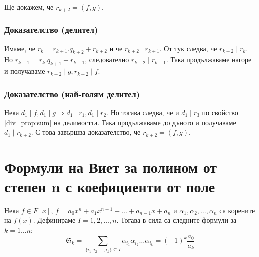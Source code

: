 \documentclass[fleqn,12pt]{article}
\begin{document}
Ще докажем, че $r_{k+2} = (f,g)$.

\subsubsection{Доказателство (делител)}
Имаме, че $r_k = r_{k + 1} . q_{k + 2} + r_{k + 2}$ и че $r_{k+2} \mid r_{k+1}$.
От тук следва, че $r_{k+2} \mid r_k$. Но $r_{k - 1} = r_{k} . q_{k + 1} + r_{k + 1}$,
следователно $r_{k+2} \mid r_{k-1}$. Така продължаваме нагоре и получаваме $r_{k+2} \mid g, r_{k+2} \mid f$.

\subsubsection{Доказателство (най-голям делител)}
Нека $d_1 \mid f, d_1 \mid g \Rightarrow d_1 \mid r_1, d_1 \mid r_2$.
Но тогава следва, че и $d_1 \mid r_3$ по свойство \ref{div_prop:sum} на делимостта.
Така продължаваме до дъното и получаваме $d_1 \mid r_{k+2}$. С това завършва доказателство, че $r_{k+2} = (f,g)$.


\section{Формули на Виет за полином от степен n с коефициенти от поле}
Нека $f \in F[x]$, $f = a_0 x^n + a_1 x^{n-1} + \dots + a_{n-1} x + a_n$
и $\alpha_1, \alpha_2, \dots, \alpha_n$ са корените на $f(x)$. Дефинираме $I = {1, 2, \dots, n}$. 
Тогава в сила са следните формули за $k=1\dots n$:
\[ \mathfrak{S}_k = \sum_{\{i_1, i_2, \dots, i_k \} \subseteq I} \alpha_{i_1} \alpha_{i_2} \dots \alpha_{i_k} = (-1)^k \frac{a_0}{a_k} \]
\end{document}
